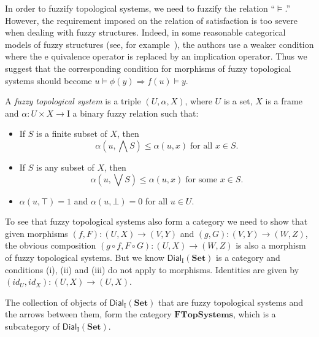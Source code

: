 \documentclass[11pt]{article}
\newenvironment{definition}[1][Definition]{\begin{trivlist}
\item[\hskip \labelsep {\bfseries #1}]}{\end{trivlist}}
\begin{document}
In order to fuzzify topological systems, we need to fuzzify the relation ``$\models$.''
However, the requirement imposed on the relation of satisfaction is too severe when dealing
with fuzzy structures. Indeed, in some reasonable categorical models of fuzzy structures 
(see, for example~\cite{barr91,syropoulos06}), the authors use a weaker condition where the e
quivalence operator is replaced by an implication operator. Thus we suggest that the corresponding condition for morphisms of  fuzzy topological systems should become 
$u\models \phi(y) \Rightarrow f(u)\models y$.   
\begin{definition}
A {\em fuzzy topological system} is a triple $(U,\alpha,X)$, where $U$ is a set, $X$ is a frame
and $\alpha:U\times X\rightarrow\mathrm{I}$ a binary fuzzy relation such that:
\begin{itemize}
\item[(i)] If $S$ is a finite subset of $X$, then
\begin{displaymath}
\alpha(u, \bigwedge S)\le\alpha(u,x)\;\text{for all $x\in S$}.
\end{displaymath}
\item[(ii)] If $S$ is any subset of $X$, then 
\begin{displaymath}
\alpha(u,\bigvee S)\le\alpha(u,x)\;\text{for some $x\in S$}.
\end{displaymath}
\item[(iii)] $\alpha(u,\top)=1$ and $\alpha(u,\bot)=0$ for all $u\in U$.
\end{itemize} 
\end{definition}
To see that fuzzy topological systems also form a category we need to show that given morphisms $(f, F):(U,X)\to (V,Y)$ and  $(g, G):(V,Y)\to (W,Z)$, the obvious composition  $(g\circ f, F\circ G):(U,X)\to (W,Z)$ is also a morphism of fuzzy topological systems. But we know $\mathsf{Dial}_{\mathrm{I}}(\mathbf{Set})$ is a category and conditions (i), (ii) and (iii) do not apply to morphisms. Identities are given by $(id_U,id_X):(U,X)\to (U,X)$.

The collection of objects of $\mathsf{Dial}_{\mathrm{I}}(\mathbf{Set})$ that are fuzzy topological
systems and the arrows between them, form the category $\mathbf{FTopSystems}$, which is a
 subcategory of $\mathsf{Dial}_{\mathrm{I}}(\mathbf{Set})$. 
\end{document}
